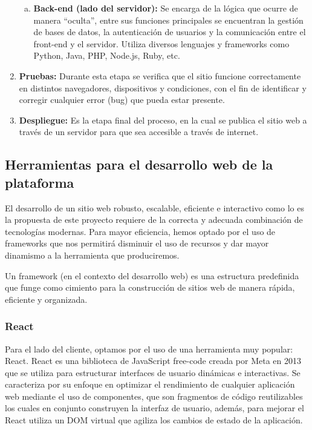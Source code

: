 \documentclass[12pt,a4paper]{report}
\begin{document}
\begin{enumerate}
\begin{enumerate}[a.]
\item \textbf{Back-end (lado del servidor):} Se encarga de la lógica que ocurre de manera ``oculta'', entre sus funciones principales se encuentran la gestión de bases de datos, la autenticación de usuarios y la comunicación entre el front-end y el servidor. Utiliza diversos lenguajes y frameworks como Python, Java, PHP, Node.js, Ruby, etc.
\end{enumerate}

\item \textbf{Pruebas:} Durante esta etapa se verifica que el sitio funcione correctamente en distintos navegadores, dispositivos y condiciones, con el fin de identificar y corregir cualquier error (bug) que pueda estar presente.

\item \textbf{Despliegue:} Es la etapa final del proceso, en la cual se publica el sitio web a través de un servidor para que sea accesible a través de internet.
\end{enumerate}

\subsection{Herramientas para el desarrollo web de la plataforma}

El desarrollo de un sitio web robusto, escalable, eficiente e interactivo como lo es la propuesta de este proyecto requiere de la correcta y adecuada combinación de tecnologías modernas. Para mayor eficiencia, hemos optado por el uso de frameworks que nos permitirá disminuir el uso de recursos y dar mayor dinamismo a la herramienta que produciremos.

Un framework (en el contexto del desarrollo web) es una estructura predefinida que funge como cimiento para la construcción de sitios web de manera rápida, eficiente y organizada.

\subsubsection{React}

Para el lado del cliente, optamos por el uso de una herramienta muy popular: React. React es una biblioteca de JavaScript free-code creada por Meta en 2013 que se utiliza para estructurar interfaces de usuario dinámicas e interactivas. Se caracteriza por su enfoque en optimizar el rendimiento de cualquier aplicación web mediante el uso de componentes, que son fragmentos de código reutilizables los cuales en conjunto construyen la interfaz de usuario, además, para mejorar el React utiliza un DOM virtual que agiliza los cambios de estado de la aplicación.
\end{document}
